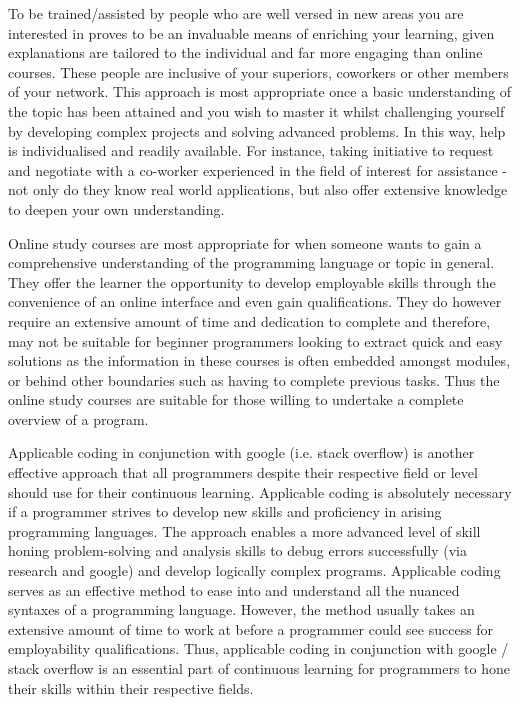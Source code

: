 \documentclass[a4paper, 11pt]{report}
\begin{document}
To be trained/assisted by people who are well versed in new areas you are interested in proves to be an invaluable means of enriching your learning, given explanations are tailored to the individual and far more engaging than online courses. These people are inclusive of your superiors, coworkers or other members of your network. This approach is most appropriate once a basic understanding of the topic has been attained and you wish to master it whilst challenging yourself by developing complex projects and solving advanced problems. In this way, help is individualised and readily available. For instance, taking initiative to request and negotiate with a co-worker experienced in the field of interest for assistance - not only do they know real world applications, but also offer extensive knowledge to deepen your own understanding.

Online study courses are most appropriate for when someone wants to gain a comprehensive understanding of the programming language or topic in general. They offer the learner the opportunity to develop employable skills through the convenience of an online interface and even gain qualifications. They do however require an extensive amount of time and dedication to complete and therefore, may not be suitable for beginner programmers looking to extract quick and easy solutions as the information in these courses is often embedded amongst modules, or behind other boundaries such as having to complete previous tasks. Thus the online study courses are suitable for those willing to undertake a complete overview of a program.

Applicable coding in conjunction with google (i.e. stack overflow) is another effective approach that all programmers despite their respective field or level should use for their continuous learning. Applicable coding is absolutely necessary if a programmer strives to develop new skills and proficiency in arising programming languages. The approach enables a more advanced level of skill honing problem-solving and analysis skills to debug errors successfully (via research and google) and develop logically complex programs. Applicable coding serves as an effective method to ease into and understand all the nuanced syntaxes of a programming language. However, the method usually takes an extensive amount of time to work at before a programmer could see success for employability qualifications. Thus, applicable coding in conjunction with google / stack overflow is an essential part of continuous learning for programmers to hone their skills within their respective fields. 
\end{document}
